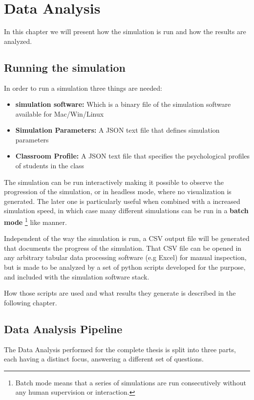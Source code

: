 \chapter{Data Analysis}
In this chapter we will present how the simulation is run and how the results are analyzed.

\section{Running the simulation}
In order to run a simulation three things are needed:

\begin{itemize}
    \item \textbf{simulation software:} Which is a binary file of the simulation software available for Mac/Win/Linux
    \item \textbf{Simulation Parameters:} A JSON text file that defines simulation parameters
    \item \textbf{Classroom Profile:} A JSON text file that specifies the psychological profiles of students in the class
\end{itemize}

The simulation can be run interactively making it possible to observe the progression
of the simulation, or in headless mode, where no visualization is generated.
The later one is particularly useful when combined with a increased simulation
speed, in which case many different simulations can be run in a \textbf{batch mode}
\footnote{Batch mode means that a series of simulations are run consecutively without
any human supervision or interaction.} like manner.

\bb

Independent of the way the simulation is run, a CSV output file will be generated that
documents the progress of the simulation. That CSV file can be opened in any
arbitrary tabular data processing software (e.g Excel) for manual inspection, but
is made to be analyzed by a set of python scripts developed for the purpose, and
included with the simulation software stack.

How those scripts are used and what results they generate is described in the following chapter.

\section{Data Analysis Pipeline}
The Data Analysis performed for the complete thesis is split into three parts, each 
having a distinct focus, answering a different set of questions.

